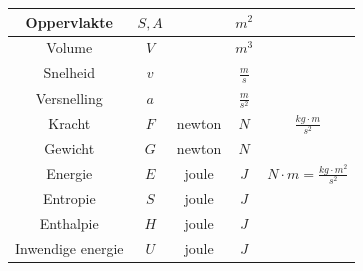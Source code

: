 \documentclass{ximera}
\begin{document}
\begin{longtable}{|c|c||c|c|c|}
\hline
Oppervlakte                                & $S, A$                                  &                                            & $m^2$                               & ~                                                          \\ 
\hline
Volume                                     & $V$                                      &                                            & $m^3$                               & ~                                                          \\ 
\hline
Snelheid                                   & $v$                                      &                                            & $\frac{m}{s}$                       & ~                                                          \\ 
\hline
Versnelling                                 & $a$                                     &                                          & $\frac{m}{s^2}$                     & ~                                                          \\ 
\hline
Kracht                                      & $F$                                      & newton                                     & $N$                                 & $\frac{kg\cdot m}{s^2} $                                   \\ 
\hline
Gewicht                                     & $G$                                      & newton                                     & $N$                                 & ~                                                          \\ 
\hline
Energie                                     & $E$                                      & joule                                      & $J$                                 & $N\cdot m  = \frac{kg\cdot m^2}{s^2}$                      \\ 
\hline
Entropie                                   & $S$                                      & joule                                      & $J$                                 & ~                                                          \\ 
\hline
Enthalpie                                   & $H$                                      & joule                                    & $J$                                 & ~                                                          \\ 
\hline
Inwendige energie                           & $U$                                      & joule& $J$                                 &                                                           \\ 

\end{longtable}
\end{document}
